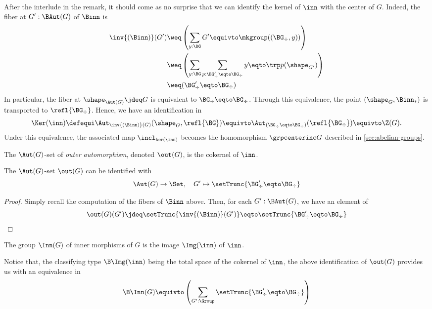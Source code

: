 After the interlude in the remark, it should come as no surprise that we can
identify the kernel of $\inn$ with the center of $G$. Indeed, the fiber at
$G':\BAut(G)$ of $\Binn$ is
\begin{align*}
  \inv{(\Binn)} (G') &\weq \left(  \sum_{y:\BG}G' \equivto \mkgroup((\BG_\div,y)) \right)
  \\
  &\weq \left( \sum_{y:\BG}\sum_{p:\BG'_\div \eqto \BG_\div} y \eqto \trp p (\shape_{G'}) \right)
  \\
  &\weq (\BG'_\div \eqto \BG_\div)
\end{align*}
In particular, the fiber at $\shape_{\Aut(G)} \jdeq G$ is equivalent to
$\BG_\div \eqto \BG_\div$. Through this equivalence, the point $(\shape_G,\Binn_{\ast})$ is
transported to $\refl{\BG_\div}$. Hence, we have an identification in
\begin{displaymath}
  \Ker(\inn) \defequi \Aut_{\inv{(\Binn)} (G)}(\shape_G, \refl{\BG})
  \equivto \Aut_{(\BG_\div \eqto \BG_\div)}(\refl{\BG_\div})
  \equivto \Z(G).
\end{displaymath}
Under this equivalence, the associated map $\incl_{\ker(\inn)}$ becomes the
homomorphism $\grpcenterinc G$ described in \cref{sec:abelian-groups}.

\newcommand{\outaut}{\constant{out}}%
\begin{definition}
  The $\Aut(G)$-set of {\em outer automorphism}, denoted $\out(G)$, is the
  cokernel of $\inn$.
\end{definition}
\begin{lemma}\label{lemma:coker-out-action}%
  The $\Aut(G)$-set $\out(G)$ can be identified with
  \begin{displaymath}
    \Aut(G) \to \Set, \quad G' \mapsto \setTrunc{\BG'_\div \eqto \BG_\div}
  \end{displaymath}
\end{lemma}
\begin{proof}
  Simply recall the computation of the fibers of $\Binn$ above. Then, for each
  $G':\BAut(G)$, we have an element of
  \begin{displaymath}
    \out(G)(G') \jdeq \setTrunc{\inv{(\Binn)}(G')} \eqto \setTrunc{\BG'_\div \eqto \BG_\div}
  \end{displaymath}
\end{proof}

\begin{definition}
  The group $\Inn(G)$ of inner morphisms of $G$ is the image $\Img (\inn)$ of
  $\inn$.
\end{definition}
Notice that, the classifying type $\B\Img(\inn)$ being the total space of the
cokernel of $\inn$, the above identification of $\out(G)$ provides us with an
equivalence in
\begin{displaymath}
  \B\Inn(G) \equivto \left( \sum_{G':\Group} \setTrunc{\BG'_\div \eqto \BG_\div} \right)
\end{displaymath}

